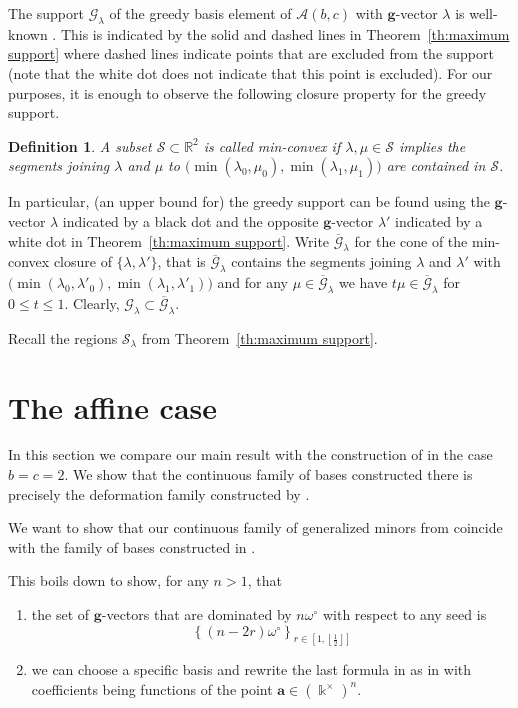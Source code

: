 \documentclass{amsart}
\newtheorem{definition}[theorem]{Definition}
\numberwithin{theorem}{section}
\newcommand{\bfa}{\boldsymbol{a}}
\newcommand{\bfg}{\boldsymbol{g}}
\newcommand{\cA}{\mathcal{A}}
\newcommand{\cG}{\mathcal{G}}
\newcommand{\cS}{\mathcal{S}}
\newcommand{\RR}{\mathbb{R}}
\newcommand{\kk}{\Bbbk}
\begin{document}
  The support $\cG_\lambda$ of the greedy basis element of $\cA(b,c)$ with $\bfg$-vector $\lambda$ is well-known \cite{LLZ,cgmmrsw}.
  This is indicated by the solid and dashed lines in Theorem~\ref{th:maximum support} where dashed lines indicate points that are excluded from the support (note that the white dot does not indicate that this point is excluded).
  For our purposes, it is enough to observe the following closure property for the greedy support.
  \begin{definition}
    A subset $\cS\subset\RR^2$ is called \emph{min-convex} if $\lambda,\mu\in\cS$ implies the segments joining $\lambda$ and $\mu$ to $\big(\min(\lambda_0,\mu_0),\min(\lambda_1,\mu_1)\big)$ are contained in $\cS$.
  \end{definition}
  In particular, (an upper bound for) the greedy support can be found using the $\bfg$-vector $\lambda$ indicated by a black dot and the opposite $\bfg$-vector $\lambda'$ indicated by a white dot in Theorem~\ref{th:maximum support}.
  Write $\overline{\cG}_\lambda$ for the cone of the min-convex closure of $\{\lambda,\lambda'\}$, that is $\overline{\cG}_\lambda$ contains the segments joining $\lambda$ and $\lambda'$ with $\big(\min(\lambda_0,\lambda'_0),\min(\lambda_1,\lambda'_1)\big)$ and for any $\mu\in\overline{\cG}_\lambda$ we have $t\mu\in\overline{\cG}_\lambda$ for $0\le t\le 1$.
  Clearly, $\cG_\lambda\subset\overline{\cG}_\lambda$.

  Recall the regions $\cS_\lambda$ from Theorem~\ref{th:maximum support}.



\section{The affine case}
\label{sec:affine}

  In this section we compare our main result with the construction of \cite{RSW19} in the case $b=c=2$.
  We show that the continuous family of bases constructed there is precisely the deformation family constructed by \cite{Qin}.


  We want to show that our continuous family of generalized minors from \cite[Theorem 4.6]{RSW19} coincide with the family of bases constructed in \cite[Theorem 1.2.1]{Qin19}.
  
  This boils down to show, for any $n>1$, that
  \begin{enumerate}
    \item 
      the set of $\bfg$-vectors that are dominated by $n\omega^\circ$ with respect to any seed is 
      \[
        \left\{(n-2r)\omega^\circ \right\}_{r\in\left[1,\left\lfloor\frac{1}{2}\right\rfloor\right]}
      \]
  
    \item
      we can choose a specific basis and rewrite the last formula in \cite[Proposition 4.4]{RSW19} as in \cite[Theorem 1.2.1]{Qin19} with coefficients being functions of the point $\bfa\in(\kk^\times)^n$. 
  \end{enumerate}
  
\end{document}
